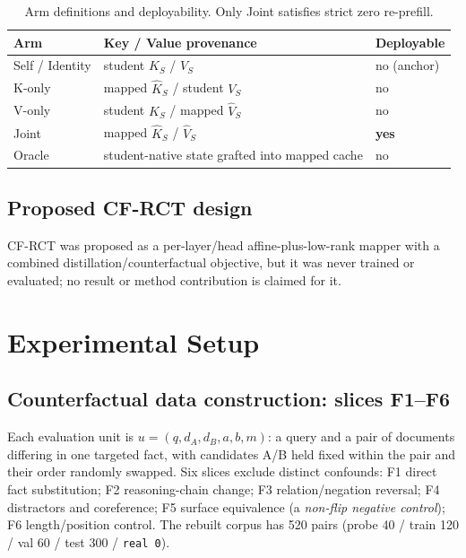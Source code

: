 \documentclass[11pt,a4paper]{article}
\begin{document}
\begin{table}[t]
\centering
\caption{Arm definitions and deployability. Only Joint satisfies strict zero
re-prefill.}
\label{tab:arms}
\begin{tabular}{lll}
\toprule
Arm & Key / Value provenance & Deployable \\
\midrule
Self / Identity & student $K_S$ / $V_S$ & no (anchor) \\
K-only & mapped $\hat{K}_S$ / student $V_S$ & no \\
V-only & student $K_S$ / mapped $\hat{V}_S$ & no \\
Joint & mapped $\hat{K}_S$ / $\hat{V}_S$ & \textbf{yes} \\
Oracle & student-native state grafted into mapped cache & no \\
\bottomrule
\end{tabular}
\end{table}

\subsection{Proposed CF-RCT design}
\label{sec:cf-rct}

CF-RCT was proposed as a per-layer/head affine-plus-low-rank mapper with a
combined distillation/counterfactual objective, but it was never trained or
evaluated; no result or method contribution is claimed for it.

\section{Experimental Setup}
\label{sec:setup}

\subsection{Counterfactual data construction: slices F1--F6}
\label{sec:data}

Each evaluation unit is $u=(q,d_A,d_B,a,b,m)$: a query and a pair of documents
differing in one targeted fact, with candidates A/B held fixed within the pair
and their order randomly swapped. Six slices exclude distinct confounds:
F1 direct fact substitution; F2 reasoning-chain change; F3 relation/negation
reversal; F4 distractors and coreference; F5 surface equivalence (a
\emph{non-flip negative control}); F6 length/position control. The rebuilt
corpus has 520 pairs (probe 40 / train 120 / val 60 / test 300 / \texttt{real 0}).
\end{document}
